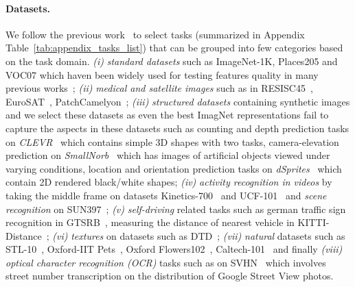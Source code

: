 \documentclass[10pt,twocolumn,letterpaper]{article}
\newcommand{\ImNet}{ImageNet-1K\xspace}
\newcommand{\Places}{Places205\xspace}
\newcommand{\VOCseven}{VOC07\xspace}
\begin{document}
\paragraph{Datasets.}
We follow the previous work~\cite{zhai2020largescale} to select  tasks (summarized in Appendix Table~\ref{tab:appendix_tasks_list}) that can be grouped into few categories based on the task domain. 
\textit{(i)} \textit{standard datasets} such as \ImNet, \Places and \VOCseven which haven been widely used for testing features quality in many previous works~\cite{caron2019unsupervised,caron2020unsupervised,yan2020clusterfit,wu2018unsupervised,goyal2019scaling}; 
\textit{(ii)} \textit{medical and satellite images} such as in RESISC45~\cite{resiscCheng2017}, EuroSAT~\cite{helber2019eurosat}, PatchCamelyon~\cite{veeling2018rotation}; 
\textit{(iii)} \textit{structured datasets} containing synthetic images and we select these datasets as even the best ImagNet representations fail to capture the aspects in these datasets such as counting and depth prediction tasks on \textit{CLEVR}~\cite{johnson2016clevr} which contains simple 3D shapes with two tasks, camera-elevation prediction on \textit{SmallNorb}~\cite{snorb2004} which has images of artificial objects viewed under varying conditions, location
and orientation prediction tasks on \textit{dSprites}~\cite{dsprites17} which contain 2D rendered black/white shapes; 
\textit{(iv)} \textit{activity recognition in videos} by taking the middle frame on datasets Kinetics-700~\cite{carreira2019short} and UCF-101~\cite{soomro2012ucf101} and \textit{scene recognition} on SUN397~\cite{sun397Chao2010}; 
\textit{(v)} \textit{self-driving} related tasks such as german traffic sign recognition in GTSRB~\cite{gtsrb2011}, measuring the distance of nearest vehicle in KITTI-Distance~\cite{kittidist2012}; 
\textit{(vi)} \textit{textures} on datasets such as DTD~\cite{cimpoi2013describing}; 
\textit{(vii)} \textit{natural} datasets such as STL-10~\cite{pmlr-v15-coates11a}, Oxford-IIT Pets~\cite{parkhi12a}, Oxford Flowers102~\cite{nilsback2008automated}, Caltech-101~\cite{caltech2006} and finally
\textit{(viii)} \textit{optical character recognition (OCR)} tasks such as on SVHN~\cite{netzer2011reading} which involves street number transcription on the distribution of Google Street View photos.
\end{document}
